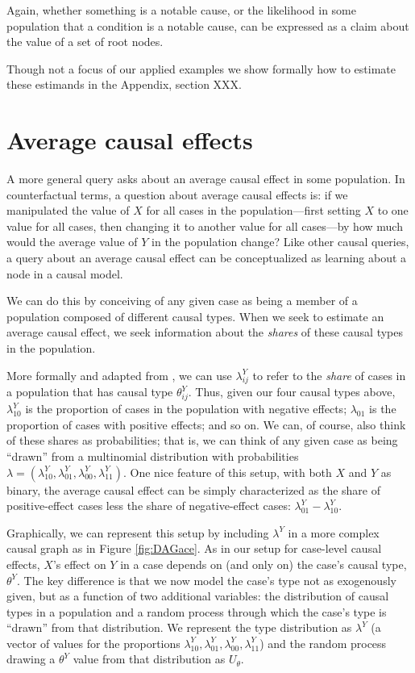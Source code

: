 \documentclass[
  12pt,
]{book}
\begin{document}
Again, whether something is a notable cause, or the likelihood in some population that a condition is a notable cause, can be expressed as a claim about the value of a set of root nodes.

Though not a focus of our applied examples we show formally how to estimate these estimands in the Appendix, section XXX.

\hypertarget{average-causal-effects}{%
\section{Average causal effects}\label{average-causal-effects}}

A more general query asks about an average causal effect in some population. In counterfactual terms, a question about average causal effects is: if we manipulated the value of \(X\) for all cases in the population---first setting \(X\) to one value for all cases, then changing it to another value for all cases---by how much would the average value of \(Y\) in the population change? Like other causal queries, a query about an average causal effect can be conceptualized as learning about a node in a causal model.

We can do this by conceiving of any given case as being a member of a population composed of different causal types. When we seek to estimate an average causal effect, we seek information about the \emph{shares} of these causal types in the population.

More formally and adapted from \citet{humphreys2015mixing}, we can use \(\lambda^Y_{ij}\) to refer to the \emph{share} of cases in a population that has causal type \(\theta^Y_{ij}\). Thus, given our four causal types above, \(\lambda^Y_{10}\) is the proportion of cases in the population with negative effects; \(\lambda_{01}\) is the proportion of cases with positive effects; and so on. We can, of course, also think of these shares as probabilities; that is, we can think of any given case as being ``drawn'' from a multinomial distribution with probabilities \(\lambda = (\lambda^Y_{10}, \lambda^Y_{01}, \lambda^Y_{00}, \lambda^Y_{11})\). One nice feature of this setup, with both \(X\) and \(Y\) as binary, the average causal effect can be simply characterized as the share of positive-effect cases less the share of negative-effect cases: \(\lambda^Y_{01} - \lambda^Y_{10}\).

Graphically, we can represent this setup by including \(\lambda^Y\) in a more complex causal graph as in Figure \ref{fig:DAGace}. As in our setup for case-level causal effects, \(X\)'s effect on \(Y\) in a case depends on (and only on) the case's causal type, \(\theta^Y\). The key difference is that we now model the case's type not as exogenously given, but as a function of two additional variables: the distribution of causal types in a population and a random process through which the case's type is ``drawn'' from that distribution. We represent the type distribution as \(\lambda^Y\) (a vector of values for the proportions \(\lambda^Y_{10}, \lambda^Y_{01}, \lambda^Y_{00}, \lambda^Y_{11}\)) and the random process drawing a \(\theta^Y\) value from that distribution as \(U_\theta\).
\end{document}
